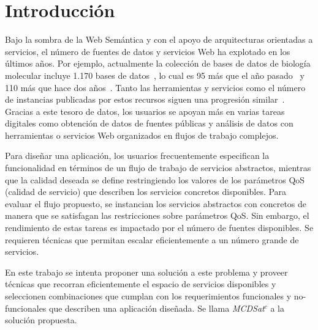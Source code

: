 \documentclass{llncs}
\begin{document}
\section{Introducción}
Bajo la sombra de la Web Semántica y con el apoyo de arquitecturas orientadas a
servicios, el número de fuentes de datos y servicios Web ha explotado en los
últimos años. Por ejemplo, actualmente la colección de bases de datos de
biología molecular incluye 1.170 bases de datos~\cite{Galperin09}, lo cual es 95
más que el año pasado~\cite{Galperin2008} y 110 más que hace dos
años~\cite{Galperin2007}. Tanto las herramientas y servicios como el número de
instancias publicadas por estos recursos siguen una progresión
similar~\cite{Benson07}. Gracias a este tesoro de datos, los usuarios se apoyan
más en varias tareas digitales como obtención de datos de fuentes públicas y
análisis de datos con herramientas o servicios Web organizados en flujos de
trabajo complejos.

Para diseñar una aplicación, los usuarios frecuentemente especifican la
funcionalidad en términos de un flujo de trabajo de servicios abstractos,
mientras que la calidad deseada se define restringiendo los valores de los
parámetros QoS (calidad de servicio) que describen los servicios concretos
disponibles. Para evaluar el flujo propuesto, se instancian los servicios
abstractos con concretos de manera que se satisfagan las restricciones sobre
parámetros QoS. Sin embargo, el rendimiento de estas tareas es impactado por el
número de fuentes disponibles. Se requieren técnicas que permitan escalar
eficientemente a un número grande de servicios.

En este trabajo se intenta proponer una solución a este problema y proveer
técnicas que recorran eficientemente el espacio de servicios disponibles y
seleccionen combinaciones que cumplan con los requerimientos funcionales y
no-funcionales que describen una aplicación diseñada. Se llama 
{\it MCDSat}$^c$ a la solución propuesta.
\end{document}
